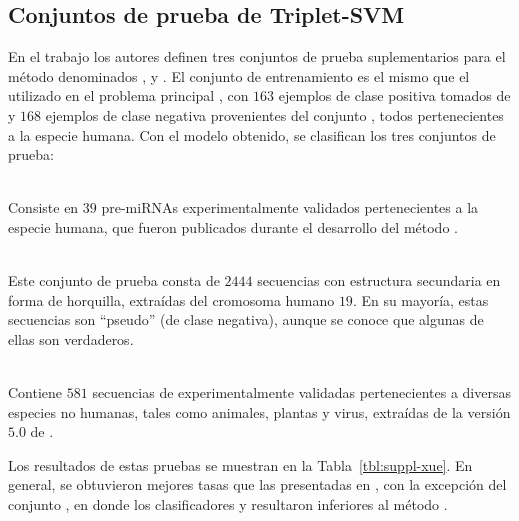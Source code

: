%
%
\subsection{Conjuntos de prueba de Triplet-SVM}
%
En el trabajo \cite{xue} los autores definen tres conjuntos de prueba
suplementarios para el método \work\tripletsvm{} denominados
,  y .
El conjunto de entrenamiento es el mismo que el utilizado en el
problema principal \prob\tripletsvm{}, con $163$ ejemplos de clase
positiva tomados de  y $168$ ejemplos de clase
negativa provenientes del conjunto , todos pertenecientes
a la especie humana.
Con el modelo obtenido, se clasifican los tres conjuntos de prueba:
%
\begin{description}
  \item{}\\
  Consiste en $39$ pre-miRNAs experimentalmente validados
  pertenecientes a la especie humana, que fueron publicados durante el
  desarrollo del método \work\tripletsvm{}.
%
  \item{}\\
  Este conjunto de prueba consta de $2444$ secuencias con estructura
  secundaria en forma de horquilla, extraídas del cromosoma humano
  $19$. En su mayoría, estas secuencias son ``pseudo'' 
  (de clase negativa), aunque se conoce que algunas de ellas son
   verdaderos.
%
  \item{}\\
  Contiene $581$ secuencias de  experimentalmente
  validadas pertenecientes a diversas especies no humanas, tales como
  animales, plantas y virus, extraídas de la versión $5$.$0$ de
  \dset\mirbase{}.
\end{description}
%
Los resultados de estas pruebas se muestran en la
Tabla~\ref{tbl:suppl-xue}.
En general, se obtuvieron mejores tasas que las presentadas en
\cite{xue}, con la excepción del conjunto , en
donde los clasificadores  y  resultaron
inferiores al método \work\tripletsvm{}.
